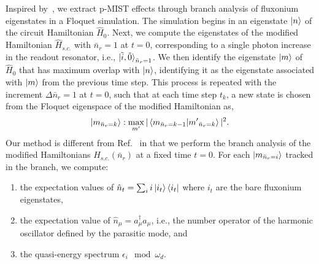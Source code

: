 \documentclass[prx,showpacs,notitlepage,twocolumn,superscriptaddress,nofootinbib,preprintnumbers,floatfix]{revtex4-2}
\begin{document}
Inspired by~\cite{dumas2024unified,cohen2023reminiscence}, we extract p-MIST effects through branch analysis of fluxonium eigenstates in a Floquet simulation. The simulation begins in an eigenstate $\ket{n}$ of the circuit Hamiltonian $\hat{H}_0$.
Next, we compute the eigenstates of the modified Hamiltonian $\hat{H}_{s.c.}$ with $\bar n_r=1$ at $t=0$, corresponding to a single photon increase in the readout resonator, i.e., $\ket{\tilde{i},\tilde{0}}_{\bar n_r=1}$. We then identify the eigenstate $\ket{m}$ of $\hat{H}_0$  that has maximum overlap with $\ket{n}$, identifying it as the eigenstate associated with $\ket{m}$ from the previous time step. This process is repeated with the increment $\Delta \bar n_r=1$ at $t=0$, such that at each time step $t_k$, a new state is chosen from the Floquet eigenspace of the modified Hamiltonian as,
\begin{align}
\ket{m_{\bar n_r=k}}:\max_{m'}|\braket{m_{\bar n_r=k-1}|{m'}_{\bar n_r=k}}|^2.   
\end{align}
Our method is different from Ref.~\cite{dumas2024unified,cohen2023reminiscence} in that we perform the branch analysis of the modified Hamiltonians $H_{s.c.}(\bar n_r)$ at a fixed time $t=0$. For each $\ket{m_{\bar n_r=i}}$ tracked in the branch, we compute:
\begin{enumerate}
    \item the expectation values of $\hat n_t=\sum_i i\ket{i_t}\bra{i_t}$ where $i_t$ are the bare fluxonium eigenstates,
    \item the expectation value of $\hat n_\mu=a_\mu^\dagger a_\mu$, i.e., the number operator of the harmonic oscillator defined by the parasitic mode, and 
    \item the quasi-energy spectrum $\epsilon_i\mod \omega_d$.
\end{enumerate}
\end{document}
